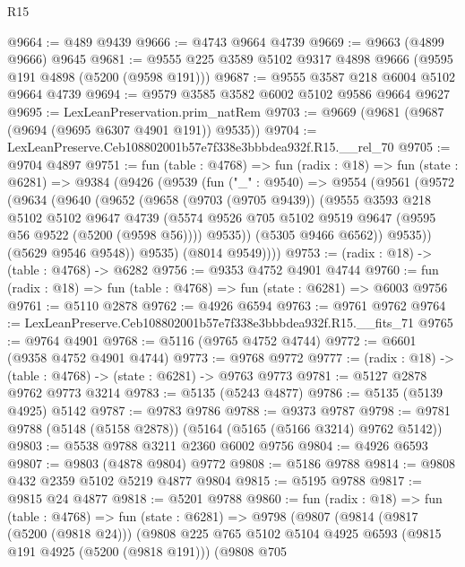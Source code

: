 \begin{lexlean}{R15}
\begin{coremodule}
{{{{{{{{{{{@9664 := @489 @9439
@9666 := @4743 @9664 @4739
@9669 := @9663 (@4899 @9666) @9645
@9681 := @9555 @225 @3589 @5102 @9317 @4898 @9666 (@9595 @191 @4898 (@5200 (@9598 @191)))
@9687 := @9555 @3587 @218 @6004 @5102 @9664 @4739
@9694 := @9579 @3585 @3582 @6002 @5102 @9586 @9664 @9627
@9695 := LexLeanPreservation.prim_natRem
@9703 := @9669 (@9681 (@9687 (@9694 (@9695 @6307 @4901 @191)) @9535))
@9704 := LexLeanPreserve.Ceb108802001b57e7f338e3bbbdea932f.R15.__rel_70
@9705 := @9704 @4897
@9751 := fun (table : @4768) =>
  fun (radix : @18) =>
  fun (state : @6281) =>
  @9384
    (@9426
      (@9539
        (fun ("_" : @9540) =>
        @9554
          (@9561
            (@9572
              (@9634
                (@9640
                  (@9652
                    (@9658
                      (@9703 (@9705 @9439))
                      (@9555
                        @3593
                        @218
                        @5102
                        @5102
                        @9647
                        @4739
                        (@5574 @9526 @705 @5102 @9519 @9647 (@9595 @56 @9522 (@5200 (@9598 @56))))
                        @9535))
                    (@5305 @9466 @6562))
                  @9535))
              (@5629 @9546 @9548))
            @9535)
          (@8014 @9549))))
@9753 := (radix : @18) -> (table : @4768) -> @6282
@9756 := @9353 @4752 @4901 @4744
@9760 := fun (radix : @18) => fun (table : @4768) => fun (state : @6281) => @6003 @9756
@9761 := @5110 @2878
@9762 := @4926 @6594
@9763 := @9761 @9762
@9764 := LexLeanPreserve.Ceb108802001b57e7f338e3bbbdea932f.R15.__fits_71
@9765 := @9764 @4901
@9768 := @5116 (@9765 @4752 @4744)
@9772 := @6601 (@9358 @4752 @4901 @4744)
@9773 := @9768 @9772
@9777 := (radix : @18) -> (table : @4768) -> (state : @6281) -> @9763 @9773
@9781 := @5127 @2878 @9762 @9773 @3214
@9783 := @5135 (@5243 @4877)
@9786 := @5135 (@5139 @4925) @5142
@9787 := @9783 @9786
@9788 := @9373 @9787
@9798 := @9781 @9788 (@5148 (@5158 @2878)) (@5164 (@5165 (@5166 @3214) @9762 @5142))
@9803 := @5538 @9788 @3211 @2360 @6002 @9756
@9804 := @4926 @6593
@9807 := @9803 (@4878 @9804) @9772
@9808 := @5186 @9788
@9814 := @9808 @432 @2359 @5102 @5219 @4877 @9804
@9815 := @5195 @9788
@9817 := @9815 @24 @4877
@9818 := @5201 @9788
@9860 := fun (radix : @18) =>
  fun (table : @4768) =>
  fun (state : @6281) =>
  @9798
    (@9807
      (@9814
        (@9817 (@5200 (@9818 @24)))
        (@9808
          @225
          @765
          @5102
          @5104
          @4925
          @6593
          (@9815 @191 @4925 (@5200 (@9818 @191)))
          (@9808
            @705
}}}}}}}}}}}
\end{coremodule}
\end{lexlean}
